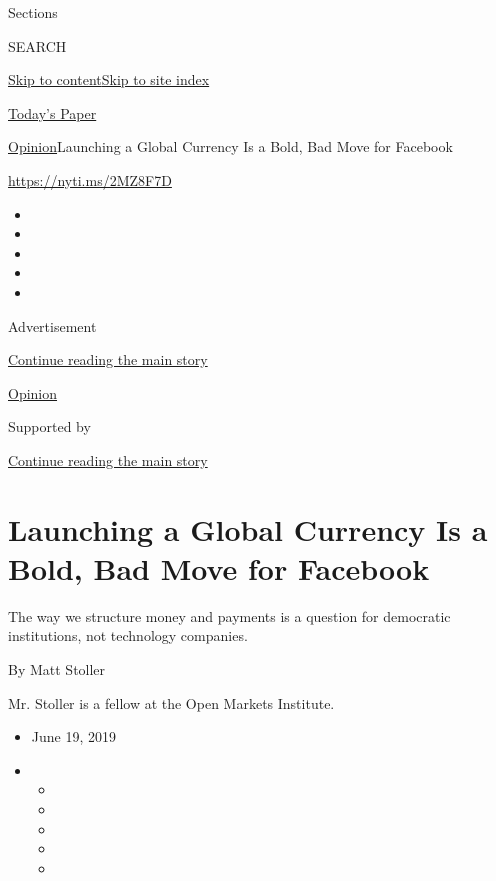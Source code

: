 Sections

SEARCH

\protect\hyperlink{site-content}{Skip to
content}\protect\hyperlink{site-index}{Skip to site index}

\href{https://myaccount.nytimes.com/auth/login?response_type=cookie\&client_id=vi}{}

\href{https://www.nytimes.com/section/todayspaper}{Today's Paper}

\href{/section/opinion}{Opinion}\textbar{}Launching a Global Currency Is
a Bold, Bad Move for Facebook

\url{https://nyti.ms/2MZ8F7D}

\begin{itemize}
\item
\item
\item
\item
\item
\end{itemize}

Advertisement

\protect\hyperlink{after-top}{Continue reading the main story}

\href{/section/opinion}{Opinion}

Supported by

\protect\hyperlink{after-sponsor}{Continue reading the main story}

\hypertarget{launching-a-global-currency-is-a-bold-bad-move-for-facebook}{%
\section{Launching a Global Currency Is a Bold, Bad Move for
Facebook}\label{launching-a-global-currency-is-a-bold-bad-move-for-facebook}}

The way we structure money and payments is a question for democratic
institutions, not technology companies.

By Matt Stoller

Mr. Stoller is a fellow at the Open Markets Institute.

\begin{itemize}
\item
  June 19, 2019
\item
  \begin{itemize}
  \item
  \item
  \item
  \item
  \item
  \end{itemize}
\end{itemize}

